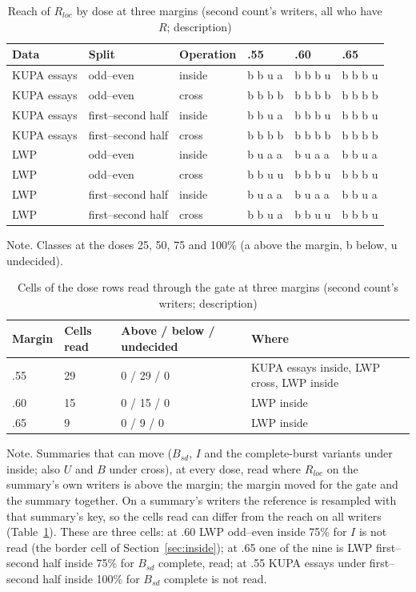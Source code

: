 \begin{table}[htbp]
\caption{Reach of $R_{loc}$ by dose at three margins (second count's writers, all who have $R$; description)}
\label{tab:marginreach}
\footnotesize
\begin{tabularx}{\linewidth}{@{}lllXXX@{}}
\toprule
Data & Split & Operation & .55 & .60 & .65 \\
\midrule
KUPA essays & odd--even & inside & b b u a & b b b u & b b b u \\
KUPA essays & odd--even & cross & b b b b & b b b b & b b b b \\
KUPA essays & first--second half & inside & b b u a & b b b u & b b b u \\
KUPA essays & first--second half & cross & b b b b & b b b b & b b b b \\
LWP & odd--even & inside & b u a a & b u a a & b b u a \\
LWP & odd--even & cross & b b u u & b b b u & b b b u \\
LWP & first--second half & inside & b u a a & b u a a & b b u a \\
LWP & first--second half & cross & b b u a & b b u u & b b b u \\
\bottomrule
\end{tabularx}
\par\smallskip\footnotesize Note. Classes at the doses 25, 50, 75 and 100\% (a above the margin, b below, u undecided).
\end{table}
\begin{table}[htbp]
\caption{Cells of the dose rows read through the gate at three margins (second count's writers; description)}
\label{tab:marginread}
\footnotesize
\begin{tabularx}{\linewidth}{@{}lllX@{}}
\toprule
Margin & Cells read & Above / below / undecided & Where \\
\midrule
.55 & 29 & 0 / 29 / 0 & KUPA essays inside, LWP cross, LWP inside \\
.60 & 15 & 0 / 15 / 0 & LWP inside \\
.65 & 9 & 0 / 9 / 0 & LWP inside \\
\bottomrule
\end{tabularx}
\par\smallskip\footnotesize Note. Summaries that can move ($B_{sd}$, $I$ and the complete-burst variants under inside; also $U$ and $B$ under cross), at every dose, read where $R_{loc}$ on the summary's own writers is above the margin; the margin moved for the gate and the summary together. On a summary's writers the reference is resampled with that summary's key, so the cells read can differ from the reach on all writers (Table~\ref{tab:marginreach}). These are three cells: at .60 LWP odd--even inside 75\% for $I$ is not read (the border cell of Section~\ref{sec:inside}); at .65 one of the nine is LWP first--second half inside 75\% for $B_{sd}$ complete, read; at .55 KUPA essays under first--second half inside 100\% for $B_{sd}$ complete is not read.
\end{table}
